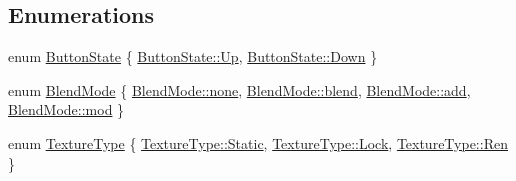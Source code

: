 \subsection*{Enumerations}
\begin{DoxyCompactItemize}
\item 
enum \mbox{\hyperlink{namespacerolmodl_ad08ec5c56aa1db118f871357b2d475fd}{Button\+State}} \{ \mbox{\hyperlink{namespacerolmodl_ad08ec5c56aa1db118f871357b2d475fda258f49887ef8d14ac268c92b02503aaa}{Button\+State\+::\+Up}}, 
\mbox{\hyperlink{namespacerolmodl_ad08ec5c56aa1db118f871357b2d475fda08a38277b0309070706f6652eeae9a53}{Button\+State\+::\+Down}}
 \}
\item 
enum \mbox{\hyperlink{namespacerolmodl_a642c095a75ddf840ce3484384ee5c822}{Blend\+Mode}} \{ \mbox{\hyperlink{namespacerolmodl_a642c095a75ddf840ce3484384ee5c822a334c4a4c42fdb79d7ebc3e73b517e6f8}{Blend\+Mode\+::none}}, 
\mbox{\hyperlink{namespacerolmodl_a642c095a75ddf840ce3484384ee5c822ac195f144a8d768f2bb87f155ed2117a4}{Blend\+Mode\+::blend}}, 
\mbox{\hyperlink{namespacerolmodl_a642c095a75ddf840ce3484384ee5c822a34ec78fcc91ffb1e54cd85e4a0924332}{Blend\+Mode\+::add}}, 
\mbox{\hyperlink{namespacerolmodl_a642c095a75ddf840ce3484384ee5c822aad148a3ca8bd0ef3b48c52454c493ec5}{Blend\+Mode\+::mod}}
 \}
\item 
enum \mbox{\hyperlink{namespacerolmodl_a7090840be12da261b3a8af5852e9f4fd}{Texture\+Type}} \{ \mbox{\hyperlink{namespacerolmodl_a7090840be12da261b3a8af5852e9f4fda84a8921b25f505d0d2077aeb5db4bc16}{Texture\+Type\+::\+Static}}, 
\mbox{\hyperlink{namespacerolmodl_a7090840be12da261b3a8af5852e9f4fdab485167c5b0e59d47009a16f90fe2659}{Texture\+Type\+::\+Lock}}, 
\mbox{\hyperlink{namespacerolmodl_a7090840be12da261b3a8af5852e9f4fdac960163b90d3348c2d10aa3dc204093d}{Texture\+Type\+::\+Ren}}
 \}
\end{DoxyCompactItemize}
